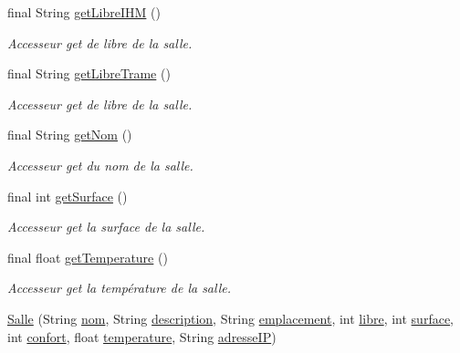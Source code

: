\begin{DoxyCompactItemize}
final String \hyperlink{classcom_1_1lasalle_1_1meeting_1_1_salle_ab86dfb73018e96230ceed49e207a8971}{get\+Libre\+I\+HM} ()
\begin{DoxyCompactList}\small\item\em Accesseur get de libre de la salle. \end{DoxyCompactList}\item 
final String \hyperlink{classcom_1_1lasalle_1_1meeting_1_1_salle_a0039fabf5867aef87f5f61f0081bcbcd}{get\+Libre\+Trame} ()
\begin{DoxyCompactList}\small\item\em Accesseur get de libre de la salle. \end{DoxyCompactList}\item 
final String \hyperlink{classcom_1_1lasalle_1_1meeting_1_1_salle_a49d977f69b2783e8ad57eccffc29e97b}{get\+Nom} ()
\begin{DoxyCompactList}\small\item\em Accesseur get du nom de la salle. \end{DoxyCompactList}\item 
final int \hyperlink{classcom_1_1lasalle_1_1meeting_1_1_salle_ad9dad6b4cfeb020195d4cde268af885f}{get\+Surface} ()
\begin{DoxyCompactList}\small\item\em Accesseur get la surface de la salle. \end{DoxyCompactList}\item 
final float \hyperlink{classcom_1_1lasalle_1_1meeting_1_1_salle_ae3235f548f8bc7ab4d05ff38ec762e77}{get\+Temperature} ()
\begin{DoxyCompactList}\small\item\em Accesseur get la température de la salle. \end{DoxyCompactList}\item 
\hyperlink{classcom_1_1lasalle_1_1meeting_1_1_salle_aa97680026b36fa9e23e8c5c164b8326d}{Salle} (String \hyperlink{classcom_1_1lasalle_1_1meeting_1_1_salle_a3641e82a9fa78c5dc8bd9a5b92bae482}{nom}, String \hyperlink{classcom_1_1lasalle_1_1meeting_1_1_salle_a79547b79b4e812619f6cc764dbe7a80b}{description}, String \hyperlink{classcom_1_1lasalle_1_1meeting_1_1_salle_a9e31fc4d4c9125e511db52da3254bcba}{emplacement}, int \hyperlink{classcom_1_1lasalle_1_1meeting_1_1_salle_a2965cb92b06dcdd28a07fa550259b1c1}{libre}, int \hyperlink{classcom_1_1lasalle_1_1meeting_1_1_salle_a1b761514679fa5f98e71809fea448384}{surface}, int \hyperlink{classcom_1_1lasalle_1_1meeting_1_1_salle_ac165425fc78429c38042a0fed650b9ee}{confort}, float \hyperlink{classcom_1_1lasalle_1_1meeting_1_1_salle_a31600559f77e2eeb1f6aa150b203213e}{temperature}, String \hyperlink{classcom_1_1lasalle_1_1meeting_1_1_salle_ad83f4f49123c8d02f2fc0da484d3e812}{adresse\+IP})

\end{DoxyCompactItemize}
